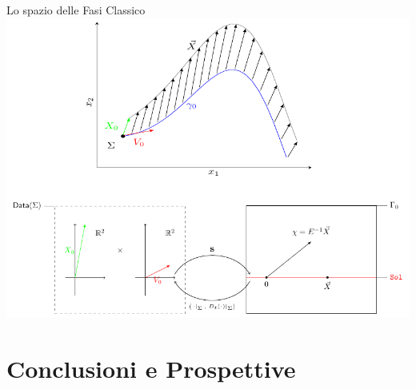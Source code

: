 \documentclass[8pt,handout]{beamer}
\begin{document}
\begin{frame}{Lo spazio delle Fasi Classico}
					\includegraphics[width=\textwidth]{../Pictures/Jacobi_GeometricPicturePanoramica}	

\end{frame}	

	


\section*{Conclusioni e Prospettive}
\end{document}
